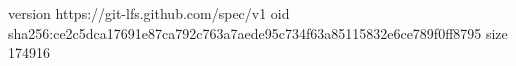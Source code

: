 version https://git-lfs.github.com/spec/v1
oid sha256:ce2c5dca17691e87ca792c763a7aede95c734f63a85115832e6ce789f0ff8795
size 174916
